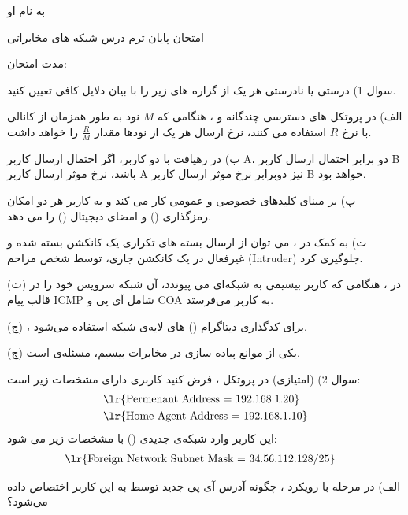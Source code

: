 \documentclass{article}
\begin{document}
{
\large 
\centering
به نام او

امتحان پایان ترم درس شبکه های مخابراتی

مدت امتحان: 

}

\hrulefill

\Large

سوال 1) درستی یا نادرستی هر یک از گزاره های زیر را با بیان دلایل کافی تعیین کنید.

الف) در پروتکل های دسترسی چندگانه 
و
، هنگامی که $M$ نود به طور همزمان از کانالی با نرخ $R$ استفاده می کنند، نرخ ارسال هر یک از نودها مقدار 
$
\frac{R}{M}
$
را خواهد داشت.

ب) در رهیافت  با دو کاربر، اگر احتمال ارسال کاربر A، دو برابر احتمال ارسال کاربر B باشد، نرخ موثر ارسال کاربر A نیز دوبرابر نرخ موثر ارسال کاربر B خواهد بود.

پ) 
بر مبنای کلیدهای خصوصی و عمومی کار می کند و به کاربر هر دو امکان رمزگذاری () و امضای دیجیتال () را می دهد.

ت) به کمک 
در ، می توان از ارسال بسته های تکراری یک کانکشن بسته شده و غیرفعال در یک کانکشن جاری، توسط شخص مزاحم (Intruder) جلوگیری کرد.

(ث) در ، هنگامی که کاربر بیسیمی به شبکه‌ای می پیوندد،  آن شبکه سرویس خود را در قالب پیام ICMP شامل آی پی  و COA به کاربر می‌فرستد.

(ج) ، برای کدگذاری دیتاگرام () های لایه‌ی شبکه استفاده می‌شود.

(چ) یکی از موانع پیاده سازی  در مخابرات بیسیم، مسئله‌ی  است.

\newpage
سوال 2) (امتیازی) در پروتکل ، فرض کنید کاربری دارای مشخصات زیر است:
\[
\begin{split}
&\text{\lr{Permenant Address = 192.168.1.20}}
\\&\text{\lr{Home Agent Address = 192.168.1.10}}
\end{split}
\]
این کاربر وارد شبکه‌ی جدیدی () با مشخصات زیر می شود:
\[
\begin{split}
&\text{\lr{Foreign Network Subnet Mask = 34.56.112.128/25}}
\end{split}
\]

الف) در مرحله  با رویکرد ، چگونه آدرس آی پی جدید توسط  به این کاربر اختصاص داده می‌شود؟
\end{document}
